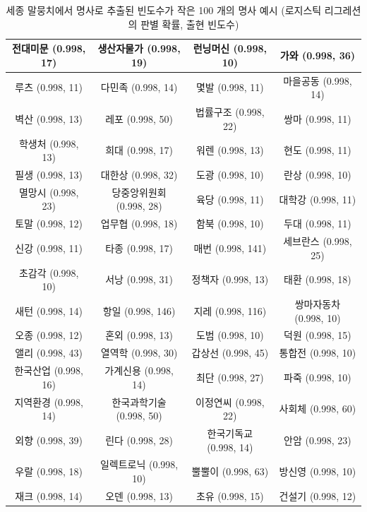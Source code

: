 \documentclass[11pt]{article}
\begin{document}
\begin{table}[H]
  \centering
  \caption{세종 말뭉치에서 명사로 추출된 빈도수가 작은 100 개의 명사 예시 (로지스틱 리그레션의 판별 확률, 출현 빈도수)}
  \label{tab:sejong_infrequent_top100}
    \begin{tabular}{|c|c|c|c|}
\hline
전대미문 (0.998, 17)   & 생산자물가 (0.998, 19)  & 런닝머신 (0.998, 10)  & 가와 (0.998, 36) \\ \hline
루츠 (0.998, 11)  & 다민족 (0.998, 14) & 몇발 (0.998, 11) & 마을공동 (0.998, 14)  \\ \hline
벽산 (0.998, 13)  & 레포 (0.998, 50)  & 법률구조 (0.998, 22)  & 쌍마 (0.998, 11) \\ \hline
학생처 (0.998, 13) & 희대 (0.998, 17)  & 워렌 (0.998, 13) & 현도 (0.998, 11) \\ \hline
필생 (0.998, 13)  & 대한상 (0.998, 32) & 도광 (0.998, 10) & 란상 (0.998, 10) \\ \hline
멸망시 (0.998, 23) & 당중앙위원회 (0.998, 28) & 육당 (0.998, 11) & 대학강 (0.998, 11)   \\ \hline
토말 (0.998, 12)  & 업무협 (0.998, 18) & 함북 (0.998, 10) & 두대 (0.998, 11) \\ \hline
신강 (0.998, 11)  & 타종 (0.998, 17)  & 매번 (0.998, 141)   & 세브란스 (0.998, 25)  \\ \hline
초감각 (0.998, 10) & 서낭 (0.998, 31)  & 정책자 (0.998, 13)   & 태환 (0.998, 18) \\ \hline
새턴 (0.998, 14)  & 항일 (0.998, 146) & 지레 (0.998, 116)   & 쌍마자동차 (0.998, 10) \\ \hline
오종 (0.998, 12)  & 혼외 (0.998, 13)  & 도범 (0.998, 10) & 덕원 (0.998, 15) \\ \hline
앨리 (0.998, 43)  & 열역학 (0.998, 30) & 갑상선 (0.998, 45)   & 통합전 (0.998, 10)   \\ \hline
한국산업 (0.998, 16)   & 가계신용 (0.998, 14)   & 최단 (0.998, 27) & 파죽 (0.998, 10) \\ \hline
지역환경 (0.998, 14)   & 한국과학기술 (0.998, 50) & 이정연씨 (0.998, 22)  & 사회체 (0.998, 60)   \\ \hline
외향 (0.998, 39)  & 린다 (0.998, 28)  & 한국기독교 (0.998, 14) & 안암 (0.998, 23) \\ \hline
우랄 (0.998, 18)  & 일렉트로닉 (0.998, 10)  & 뿔뿔이 (0.998, 63)   & 방신영 (0.998, 10)   \\ \hline
재크 (0.998, 14)  & 오덴 (0.998, 13)  & 초유 (0.998, 15) & 건설기 (0.998, 12)   \\ \hline

\end{tabular}
\end{table}
\end{document}
